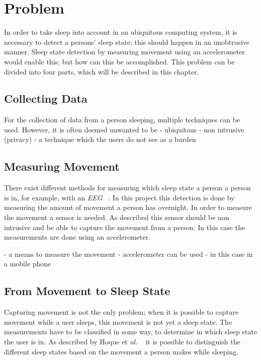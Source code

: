 \chapter{Problem} %
\label{cha:problem}
In order to take sleep into account in an ubiquitous computing system, it is necessary to detect a persons' sleep state; this should happen in an unobtrusive manner. Sleep state detection by measuring movement using an accelerometer would enable this; but how can this be accomplished. This problem can be divided into four parts, which will be described in this chapter.

\section{Collecting Data} %
\label{sec:collecting_data}
For the collection of data from a person sleeping, multiple techniques can be used. However, it is often deemed unwanted to be 
- ubiquitous
- non intrusive (privacy)
- a technique which the users do not see as a burden

\section{Measuring Movement} %
\label{sec:measuring_movement}
There exist different methods for measuring which sleep state a person a person is in, for example, with an \emph{EEG} ~\cite{Itil196976}. In this project this detection is done by measuring the amount of movement a person has overnight. In order to measure the movement a sensor is needed. As described this sensor should be non intrusive and be able to capture the movement from a person. In this case the measurements are done using an accelerometer.

- a means to measure the movement
- accelerometer can be used
- in this case in a mobile phone


\section{From Movement to Sleep State} %
\label{sec:translate_movement_patterns_to_sleep_states}
Capturing movement is not the only problem; when it is possible to capture movement while a user sleeps, this movement is not yet a sleep state. The measurements have to be classified in some way, to determine in which sleep state the user is in. As described by Hoque et \emph{al}. ~\cite{Hoque:2010:MBP:1921081.1921088} it is possible to distinguish the different sleep states based on the movement a person makes while sleeping.


